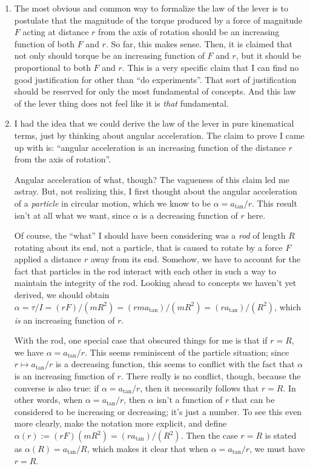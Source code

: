 \documentclass{article}
\begin{document}
\begin{enumerate}
    \item The most obvious and common way to formalize the law of the lever is to postulate that the magnitude of the torque produced by a force of magnitude $F$ acting at distance $r$ from the axis of rotation should be an increasing function of both $F$ and $r$. So far, this makes sense. Then, it is claimed that not only should torque be an increasing function of $F$ and $r$, but it should be proportional to both $F$ and $r$. This is a very specific claim that I can find no good justification for other than ``do experiments''. That sort of justification should be reserved for only the most fundamental of concepts. And this law of the lever thing does not feel like it is \textit{that} fundamental.
    
    \item I had the idea that we could derive the law of the lever in pure kinematical terms, just by thinking about angular acceleration. The claim to prove I came up with is: ``angular acceleration is an increasing function of the distance $r$ from the axis of rotation''.

    Angular acceleration of what, though? The vagueness of this claim led me astray. But, not realizing this, I first thought about the angular acceleration of a \textit{particle} in circular motion, which we know to be $\alpha = a_{\text{tan}}/r$. This result isn't at all what we want, since $\alpha$ is a decreasing function of $r$ here.

    Of course, the ``what'' I should have been considering was a \textit{rod} of length $R$ rotating about its end, not a particle, that is caused to rotate by a force $F$ applied a distance $r$ away from its end. Somehow, we have to account for the fact that particles in the rod interact with each other in such a way to maintain the integrity of the rod. Looking ahead to concepts we haven't yet derived, we should obtain $\alpha = \tau/I = (rF)/(mR^2) = (rma_{\text{tan}})/(mR^2) = (ra_{\text{tan}})/(R^2)$, which \textit{is} an increasing function of $r$. 
    
    With the rod, one special case that obscured things for me is that if $r = R$, we have $\alpha = a_{\text{tan}}/r$. This seems reminiscent of the particle situation; since $r \mapsto a_{\text{tan}}/r$ is a decreasing function, this seems to conflict with the fact that $\alpha$ is an increasing function of $r$. There really is no conflict, though, because the converse is also true: if $\alpha = a_{\text{tan}}/r$, then it necessarily follows that $r = R$. In other words, when $\alpha = a_{\text{tan}}/r$, then $\alpha$ isn't a function of $r$ that can be considered to be increasing or decreasing; it's just a number. To see this even more clearly, make the notation more explicit, and define $\alpha(r) := (rF)(mR^2) = (ra_{\text{tan}})/(R^2)$. Then the case $r = R$ is stated as $\alpha(R) = a_{\text{tan}}/R$, which makes it clear that when $\alpha = a_{\text{tan}}/r$, we must have $r = R$.


\end{enumerate}
\end{document}
